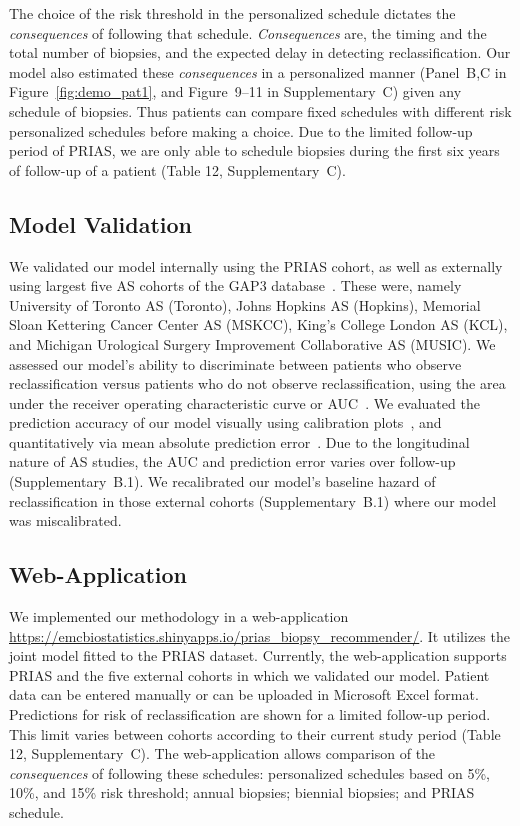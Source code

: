 The choice of the risk threshold in the personalized schedule dictates the \textit{consequences} of following that schedule. \textit{Consequences} are, the timing and the total number of biopsies, and the expected delay in detecting reclassification. Our model also estimated these \textit{consequences} in a personalized manner (Panel~B,C in Figure~\ref{fig:demo_pat1}, and Figure~9--11 in Supplementary~C) given any schedule of biopsies. Thus patients can compare fixed schedules with different risk personalized schedules before making a choice. Due to the limited follow-up period of PRIAS, we are only able to schedule biopsies during the first six years of follow-up of a patient (Table 12, Supplementary~C).

\subsection{Model Validation}
We validated our model internally using the PRIAS cohort, as well as externally using largest five AS cohorts of the GAP3 database~\citep{gap3_2018}. These were, namely University of Toronto AS (Toronto), Johns Hopkins AS (Hopkins), Memorial Sloan Kettering Cancer Center AS (MSKCC), King's College London AS (KCL), and Michigan Urological Surgery Improvement Collaborative AS (MUSIC). We assessed our model's ability to discriminate between patients who observe reclassification versus patients who do not observe reclassification, using the area under the receiver operating characteristic curve or AUC~\citep{rizopoulos2017dynamic}. We evaluated the prediction accuracy of our model visually using calibration plots~\citep{royston2013external,steyerberg2010assessing}, and quantitatively via mean absolute prediction error~\citep{rizopoulos2017dynamic}. Due to the longitudinal nature of AS studies, the AUC and prediction error varies over follow-up (Supplementary~B.1). We recalibrated our model's baseline hazard of reclassification in those external cohorts (Supplementary~B.1) where our model was miscalibrated.

\subsection{Web-Application}
We implemented our methodology in a web-application \url{https://emcbiostatistics.shinyapps.io/prias_biopsy_recommender/}. It utilizes the joint model fitted to the PRIAS dataset. Currently, the web-application supports PRIAS and the five external cohorts in which we validated our model. Patient data can be entered manually or can be uploaded in Microsoft Excel format. Predictions for risk of reclassification are shown for a limited follow-up period. This limit varies between cohorts according to their current study period (Table 12, Supplementary~C). The web-application allows comparison of the \textit{consequences} of following these schedules: personalized schedules based on 5\%, 10\%, and 15\% risk threshold; annual biopsies; biennial biopsies; and PRIAS schedule.